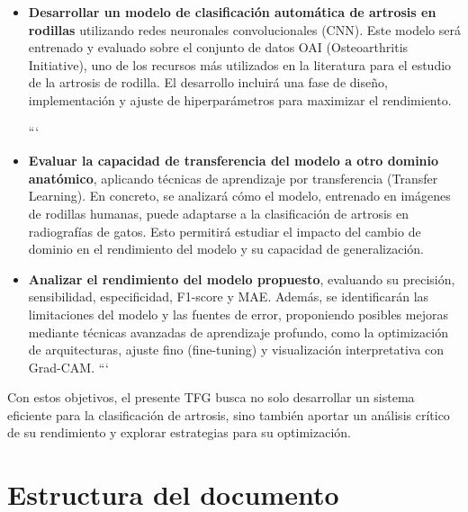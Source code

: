 \documentclass[11pt,spanish,listoffigures,listoftables]{tfgetsinf}
\begin{document}
\begin{itemize}
\item \textbf{Desarrollar un modelo de clasificación automática de artrosis en rodillas} utilizando redes neuronales convolucionales (CNN). Este modelo será entrenado y evaluado sobre el conjunto de datos OAI (Osteoarthritis Initiative), uno de los recursos más utilizados en la literatura para el estudio de la artrosis de rodilla. El desarrollo incluirá una fase de diseño, implementación y ajuste de hiperparámetros para maximizar el rendimiento.

```
\item \textbf{Evaluar la capacidad de transferencia del modelo a otro dominio anatómico}, aplicando técnicas de aprendizaje por transferencia (Transfer Learning). En concreto, se analizará cómo el modelo, entrenado en imágenes de rodillas humanas, puede adaptarse a la clasificación de artrosis en radiografías de gatos. Esto permitirá estudiar el impacto del cambio de dominio en el rendimiento del modelo y su capacidad de generalización.

\item \textbf{Analizar el rendimiento del modelo propuesto}, evaluando su precisión, sensibilidad, especificidad, F1-score y MAE. Además, se identificarán las limitaciones del modelo y las fuentes de error, proponiendo posibles mejoras mediante técnicas avanzadas de aprendizaje profundo, como la optimización de arquitecturas, ajuste fino (fine-tuning) y visualización interpretativa con Grad-CAM.
```

\end{itemize}

Con estos objetivos, el presente TFG busca no solo desarrollar un sistema eficiente para la clasificación de artrosis, sino también aportar un análisis crítico de su rendimiento y explorar estrategias para su optimización.


\section{Estructura del documento}  %

\end{document}
